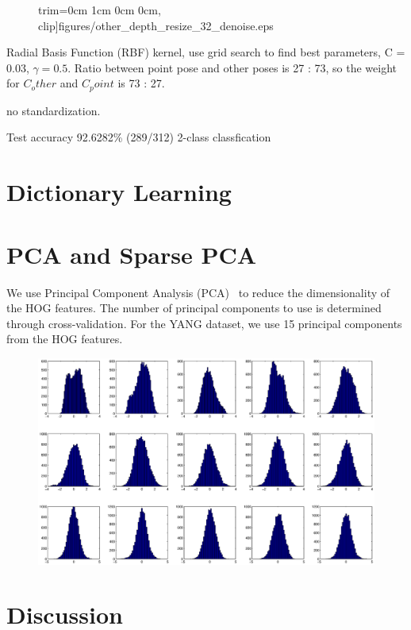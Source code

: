 \begin{figure}
{  trim={0cm 1cm 0cm 0cm}, clip]{figures/other_depth_resize_32_denoise.eps} }
\end{figure}

Radial Basis Function (RBF) kernel, use grid search to find best parameters, C =
0.03, $\gamma = 0.5$. Ratio between point pose and other poses is 27 : 73, so
the weight for $C_other$ and $C_point$ is 73 : 27. 

no standardization.

Test accuracy 92.6282\% (289/312) 2-class classfication


\section{Dictionary Learning}

\section{PCA and Sparse PCA}
We use Principal Component Analysis (PCA)~\cite{pca} to reduce the
dimensionality of the HOG features. The number of principal components to use
is determined through cross-validation. For the YANG dataset, we use 15
principal components from the HOG features.

\begin{figure}[t]
\includegraphics[width=\columnwidth]{figures/hist_pca.eps}
\end{figure}

\section{Discussion}
